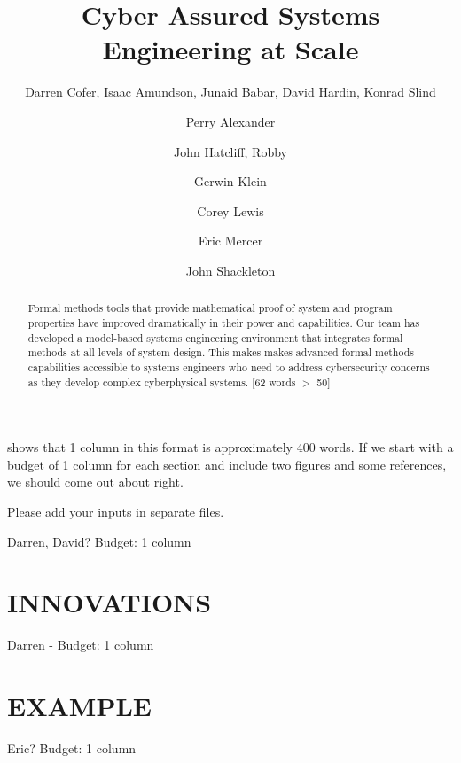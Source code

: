 \documentclass{IEEEcsmag}
\begin{document}

\title{Cyber Assured Systems Engineering at Scale}

\author{Darren Cofer, Isaac Amundson, Junaid Babar, David Hardin, Konrad Slind}

\author{Perry Alexander}

\author{John Hatcliff, Robby}

\author{Gerwin Klein}

\author{Corey Lewis}

\author{Eric Mercer}

\author{John Shackleton}


\begin{abstract}
Formal methods tools that provide mathematical proof of system and program properties 
have improved dramatically in their power and capabilities. Our team has developed a model-based systems 
engineering environment that integrates formal methods at all levels of system design. 
This makes makes advanced formal methods capabilities accessible to systems engineers who need to address 
cybersecurity concerns as they develop complex cyberphysical systems. 
[62 words $>$ 50]
\end{abstract}

\maketitle


 shows that 1 column in this format is approximately 400 words.  If we start with a budget of 1 column for each section and include two figures and some references, we should come out about right.  

Please add your inputs in separate files.

Darren, David? Budget: 1 column


\section{INNOVATIONS}
Darren -  Budget: 1 column


\section{EXAMPLE}
Eric?  Budget: 1 column

\end{document}
